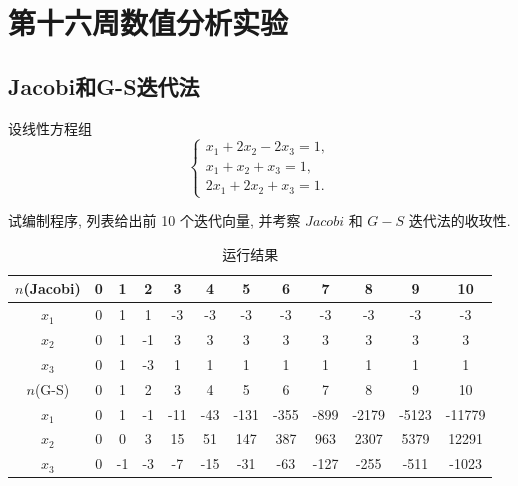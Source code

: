 \section{第十六周数值分析实验}
\subsection{Jacobi和G-S迭代法}
\begin{ex}
设线性方程组
$$
\left\{\begin{array}{l}
	x_1+2 x_2-2 x_3=1, \\
	x_1+x_2+x_3=1, \\
	2 x_1+2 x_2+x_3=1 .
\end{array}\right.
$$

试编制程序, 列表给出前 10 个迭代向量, 并考察 $J a c o b i$ 和 $G-S$ 迭代法的收玫性.
\end{ex}

\qa 
\begin{table}[H]
	\centering
	\caption{运行结果}
	\begin{tabular}{|c|ccccccccccc|}
		\hline
		$n$(Jacobi) & 0     & 1     & 2     & 3     & 4     & 5     & 6     & 7     & 8     & 9     & 10 \\
		\hline
		$x_1$    & 0     & 1     & 1     & -3    & -3    & -3    & -3    & -3    & -3    & -3    & -3 \\
		$x_2$   & 0     & 1     & -1    & 3     & 3     & 3     & 3     & 3     & 3     & 3     & 3 \\
		$x_3$    & 0     & 1     & -3    & 1     & 1     & 1     & 1     & 1     & 1     & 1     & 1 \\
		\hline\hline
		$n$(G-S) & 0     & 1     & 2     & 3     & 4     & 5     & 6     & 7     & 8     & 9     & 10 \\
		\hline
		$x_1$    & 0     & 1     & -1    & -11   & -43   & -131  & -355  & -899  & -2179 & -5123 & -11779 \\
		$x_2$    & 0     & 0     & 3     & 15    & 51    & 147   & 387   & 963   & 2307  & 5379  & 12291 \\
		$x_3$    & 0     & -1    & -3    & -7    & -15   & -31   & -63   & -127  & -255  & -511  & -1023 \\
		\hline
	\end{tabular}%
	\label{tab:addlabel-w16-1}%
\end{table}%


